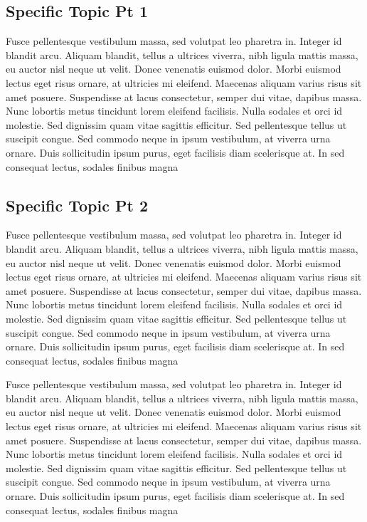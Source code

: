 \documentclass[linenumbers,RNAAS,trackchanges]{aastex631}
\begin{document}
\subsection{Specific Topic Pt 1} \label{sec:subtopic1}
Fusce pellentesque vestibulum massa, sed volutpat leo pharetra in. Integer id blandit arcu. Aliquam blandit, tellus a ultrices viverra, nibh ligula mattis massa, eu auctor nisl neque ut velit. Donec venenatis euismod dolor. Morbi euismod lectus eget risus ornare, at ultricies mi eleifend. Maecenas aliquam varius risus sit amet posuere. Suspendisse at lacus consectetur, semper dui vitae, dapibus massa. Nunc lobortis metus tincidunt lorem eleifend facilisis. Nulla sodales et orci id molestie. Sed dignissim quam vitae sagittis efficitur. Sed pellentesque tellus ut suscipit congue. Sed commodo neque in ipsum vestibulum, at viverra urna ornare. Duis sollicitudin ipsum purus, eget facilisis diam scelerisque at. In sed consequat lectus, sodales finibus magna


\subsection{Specific Topic Pt 2} \label{sec:subtopic2}
Fusce pellentesque vestibulum massa, sed volutpat leo pharetra in. Integer id blandit arcu. Aliquam blandit, tellus a ultrices viverra, nibh ligula mattis massa, eu auctor nisl neque ut velit. Donec venenatis euismod dolor. Morbi euismod lectus eget risus ornare, at ultricies mi eleifend. Maecenas aliquam varius risus sit amet posuere. Suspendisse at lacus consectetur, semper dui vitae, dapibus massa. Nunc lobortis metus tincidunt lorem eleifend facilisis. Nulla sodales et orci id molestie. Sed dignissim quam vitae sagittis efficitur. Sed pellentesque tellus ut suscipit congue. Sed commodo neque in ipsum vestibulum, at viverra urna ornare. Duis sollicitudin ipsum purus, eget facilisis diam scelerisque at. In sed consequat lectus, sodales finibus magna


Fusce pellentesque vestibulum massa, sed volutpat leo pharetra in. Integer id blandit arcu. Aliquam blandit, tellus a ultrices viverra, nibh ligula mattis massa, eu auctor nisl neque ut velit. Donec venenatis euismod dolor. Morbi euismod lectus eget risus ornare, at ultricies mi eleifend. Maecenas aliquam varius risus sit amet posuere. Suspendisse at lacus consectetur, semper dui vitae, dapibus massa. Nunc lobortis metus tincidunt lorem eleifend facilisis. Nulla sodales et orci id molestie. Sed dignissim quam vitae sagittis efficitur. Sed pellentesque tellus ut suscipit congue. Sed commodo neque in ipsum vestibulum, at viverra urna ornare. Duis sollicitudin ipsum purus, eget facilisis diam scelerisque at. In sed consequat lectus, sodales finibus magna
\end{document}
